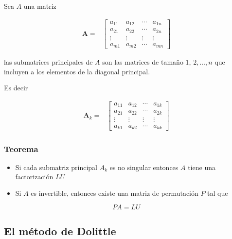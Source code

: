 \documentclass[
]{article}
\begin{document}
Sea \(A\) una matriz

\begin{equation}
\begin{array}{cc}
\mathbf{A}  =&  \begin{bmatrix}
        a_{11}  & a_{12}  & \cdots   & a_{1n}   \\
        a_{21}  & a_{22}  & \cdots   & a_{2n} \\
        \vdots   & \vdots  & \vdots   & \vdots \\
        a_{m1}  & a_{m2}  & \cdots   & a_{mn} 
  \end{bmatrix}
\end{array}
\end{equation}

las submatrices principales de \(A\) son las matrices de tamaño \(1\),
\(2,\ldots,n\) que incluyen a los elementos de la diagonal principal.

Es decir

\begin{equation}
\begin{array}{cc}
\mathbf{A}_k  =&  \begin{bmatrix}
                    a_{11}  & a_{12}  & \cdots   & a_{1k}   \\
                    a_{21}  & a_{22}  & \cdots   & a_{2k} \\
                    \vdots   & \vdots  & \vdots   & \vdots \\
                    a_{k1}  & a_{k2}  & \cdots   & a_{kk} 
                  \end{bmatrix}
\end{array}
\end{equation}

\hypertarget{teorema-3}{%
\subsubsection{Teorema}\label{teorema-3}}

\begin{itemize}
\item
  Si cada submatriz principal \(A_k\) es no singular entonces \(A\)
  tiene una factorización \(LU\)
\item
  Si \(A\) es invertible, entonces existe una matriz de permutación
  \(P\) tal que
\end{itemize}

\[
PA = LU
\]

\hypertarget{el-muxe9todo-de-dolittle}{%
\subsection{El método de Dolittle}\label{el-muxe9todo-de-dolittle}}
\end{document}
